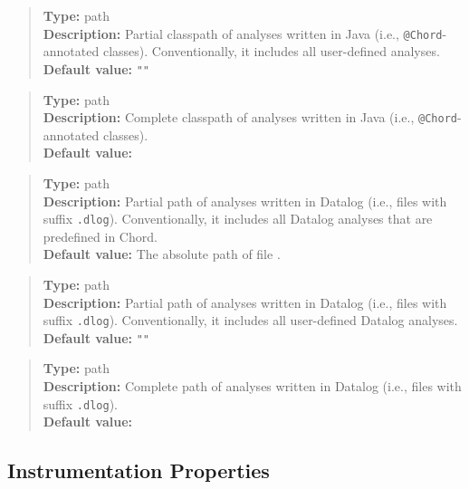 \begin{quote}
{\bf Type:} path \\
{\bf Description:} Partial classpath of analyses written in Java (i.e., {\tt @Chord}-annotated classes).
Conventionally, it includes all user-defined analyses. \\
{\bf Default value:} {\tt ""}
\end{quote}

\begin{quote}
{\bf Type:} path \\
{\bf Description:} Complete classpath of analyses written in Java (i.e., {\tt @Chord}-annotated classes). \\
{\bf Default value:} 
\end{quote}

\begin{quote}
{\bf Type:} path \\
{\bf Description:} Partial path of analyses written in Datalog (i.e., files with suffix {\tt .dlog}).
Conventionally, it includes all Datalog analyses that are predefined in Chord. \\
{\bf Default value:} The absolute path of file .
\end{quote}

\begin{quote}
{\bf Type:} path \\
{\bf Description:} Partial path of analyses written in Datalog (i.e., files with suffix {\tt .dlog}).
Conventionally, it includes all user-defined Datalog analyses. \\
{\bf Default value:} {\tt ""}
\end{quote}

\begin{quote}
{\bf Type:} path  \\
{\bf Description:} Complete path of analyses written in Datalog (i.e., files with suffix {\tt .dlog}). \\
{\bf Default value:} 
\end{quote}

\subsection{Instrumentation Properties}
\label{sec:instr-props}

